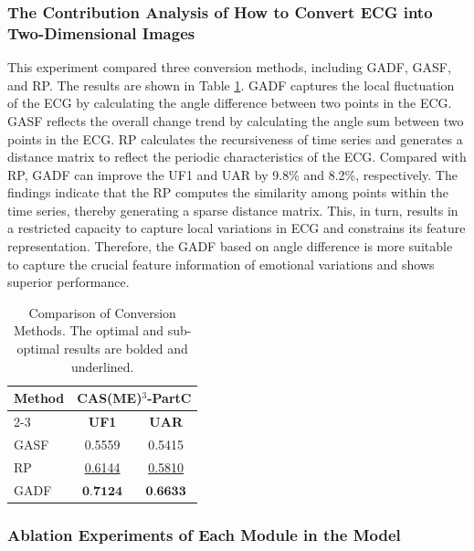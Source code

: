 \documentclass[lettersize,journal]{IEEEtran}
\begin{document}
\subsubsection{The Contribution Analysis of How to Convert ECG into Two-Dimensional Images}

This experiment compared three conversion methods, including GADF\cite{34}, GASF\cite{34}, and RP\cite{47}. The results are shown in Table \ref{tab:table5}. GADF captures the local fluctuation of the ECG by calculating the angle difference between two points in the ECG. GASF reflects the overall change trend by calculating the angle sum between two points in the ECG. RP calculates the recursiveness of time series and generates a distance matrix to reflect the periodic characteristics of the ECG.  Compared with RP, GADF can improve the UF1 and UAR by 9.8\% and 8.2\%, respectively. The findings indicate that the RP computes the similarity among points within the time series, thereby generating a sparse distance matrix. This, in turn, results in a restricted capacity to capture local variations in ECG and constrains its feature representation. Therefore, the GADF based on angle difference is more suitable to capture the crucial feature information of emotional variations and shows superior performance.


\begin{table}[!t]
\caption{Comparison of Conversion Methods. The optimal and sub-optimal results are bolded and underlined.\label{tab:table5}}
\centering
\setlength{\tabcolsep}{27pt}
\begin{tabular}{lcc}
\toprule[1.5pt]
\multirow{2}{*}{\textbf{Method}} &
\multicolumn{2}{c}{\textbf{CAS(ME)$^{3}$-PartC}} \\
\cmidrule[1pt]{2-3}
& \textbf{UF1} & \textbf{UAR} \\
\midrule
GASF  & 0.5559 & 0.5415 \\
RP   & \underline{0.6144} & \underline{0.5810} \\
GADF  & $\textbf{0.7124}$ & $\textbf{0.6633}$ \\
\bottomrule[1.5pt]
\end{tabular}
\end{table}

\subsubsection{Ablation Experiments of Each Module in the Model}
\end{document}
